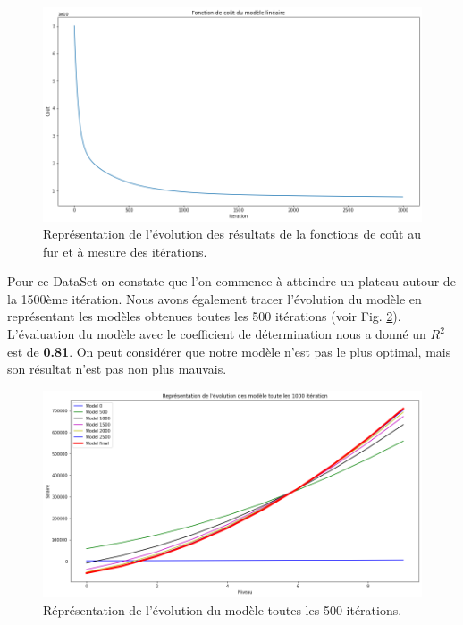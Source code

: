 \documentclass[french]{article}
\begin{document}
\begin{figure}[!htbp]
    \centering
    \includegraphics[width=\textwidth]{Rapport/images/cout_MLP.png}
    \caption{Représentation de l'évolution des résultats de la fonctions de coût au fur et à mesure des itérations.}
    \label{fig:cout_MLP}
\end{figure}

Pour ce DataSet on constate que l'on commence à atteindre un plateau autour de la 1500ème itération. Nous avons également tracer l'évolution du modèle en représentant les modèles obtenues toutes les 500 itérations (voir Fig. \ref{fig:evo_MLP}). L'évaluation du modèle avec le coefficient de détermination nous a donné un $R^{2}$ est de \textbf{0.81}. On peut considérer que notre modèle n'est pas le plus optimal, mais son résultat n'est pas non plus mauvais.

\begin{figure}[!htbp]
    \centering
    \includegraphics[width=\textwidth]{Rapport/images/evo_MLP.png}
    \caption{Réprésentation de l'évolution du modèle toutes les 500 itérations.}
    \label{fig:evo_MLP}
\end{figure}
\end{document}
